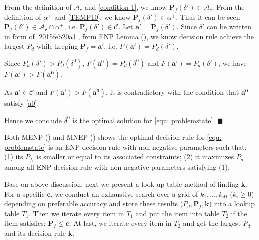 From the definition of $\mathcal{A}_c$ and \eqref{condition 1}, we know $\mathbf{P}_f(\delta') \in \mathcal{A}_c$. 
From the definition of $\alpha^+$ and \eqref{TEMP10}, we know $\mathbf{P}_f(\delta') \in \alpha^+$. 
Thus it can be seen $\mathbf{P}_f(\delta') \in \mathcal{A}_\mathbf{c} \cap \alpha^+$, i.e. $\mathbf{P}_f(\delta') \in \mathcal{C}$.  
Let $\mathbf{a}' = \mathbf{P}_f(\delta')$. 
Since $\delta'$ can be written in form of \eqref{2015feb20a1}, from ENP Lemma (), we know decision rule achieve the largest $P_d$ while keeping $\mathbf{P}_f = \mathbf{a}'$, i.e.  
$F(\mathbf{a}') = P_d(\delta')$. 

Since $P_d(\delta') > P_d(\delta^0)$, $F(\mathbf{a}^0) = P_d(\delta^0)$ and  $F(\mathbf{a}') = P_d(\delta')$, we have $F(\mathbf{a'}) > F(\mathbf{a^0})$. 

As $\mathbf{a}' \in \mathcal{C}$ and $F(\mathbf{a'}) > F(\mathbf{a^0})$, it is contradictory with the condition that $\mathbf{a^0}$ satisfy \eqref{a0}.

Hence we conclude $\delta^0$ is the optimal solution for \eqref{equ: problemstate}. $\blacksquare$

Both MENP () and MNEP () shows the optimal decision rule for \eqref{equ: problemstate} is an ENP decision rule  with non-negative parameters such that: (1) its $P_{f_i}$ is smaller or equal to its associated constraints; (2) it maximizes $P_d$ among all ENP decision rule with non-negative parameters satisfying (1).

Base on above discussion, 
next we present a look-up table method of finding $\mathbf{k}$. For a specific $\mathbf{c}$, we conduct an exhaustive search over a grid of $k_1, ..., k_M$ ($k_i \geq 0$) depending on preferable accuracy and store these results ($P_d, \mathbf{P}_f, \mathbf{k}$) into a lookup table $T_1$. 
Then we iterate every item in $T_1$ and put the item into table $T_2$ if the item satisfies:  $\mathbf{P}_f \leq \mathbf{c}$.
At last, we iterate every item in $T_2$ and get the largest $P_d$ and its decision rule $\mathbf{k}$.


